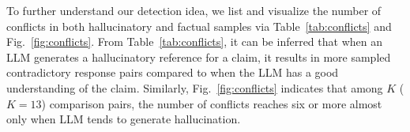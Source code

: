 To further understand our detection idea, we list and visualize the number of conflicts in both hallucinatory and factual samples via Table~\ref{tab:conflicts} and Fig.~\ref{fig:conflicts}. From Table~\ref{tab:conflicts}, it can be inferred that when an LLM generates a hallucinatory reference for a claim, it results in more sampled contradictory response pairs compared to when the LLM has a good understanding of the claim. Similarly, Fig.~\ref{fig:conflicts} indicates that among $K$ ($K=13$) comparison pairs, the number of conflicts reaches six or more almost only when LLM tends to generate hallucination. 
 




